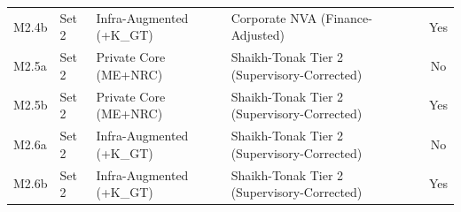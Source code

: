 \begin{table}[H]
\begin{tabular}{ll p{4cm} p{5.5cm} c}
M2.4b & Set 2 & Infra-Augmented (+K\_GT) & Corporate NVA (Finance-Adjusted) & Yes \\
M2.5a & Set 2 & Private Core (ME+NRC) & Shaikh-Tonak Tier 2 (Supervisory-Corrected) & No \\
M2.5b & Set 2 & Private Core (ME+NRC) & Shaikh-Tonak Tier 2 (Supervisory-Corrected) & Yes \\
M2.6a & Set 2 & Infra-Augmented (+K\_GT) & Shaikh-Tonak Tier 2 (Supervisory-Corrected) & No \\
M2.6b & Set 2 & Infra-Augmented (+K\_GT) & Shaikh-Tonak Tier 2 (Supervisory-Corrected) & Yes \\
\bottomrule
\end{tabular}
\end{table}
